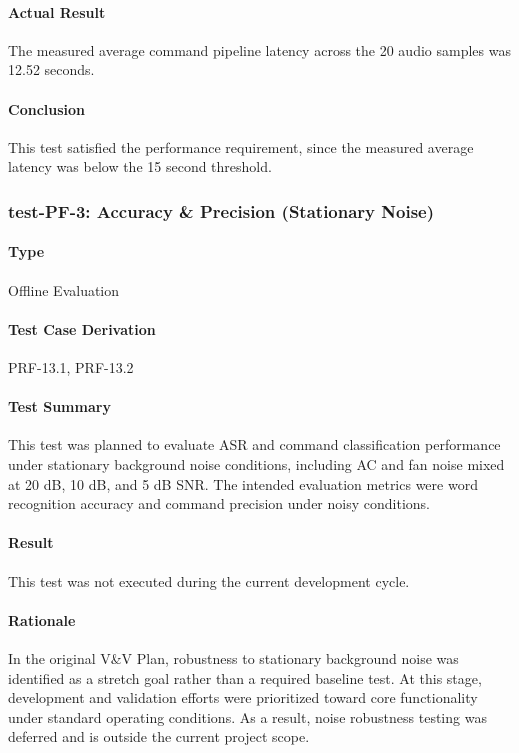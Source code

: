 \documentclass[12pt, titlepage]{article}
\begin{document}
\paragraph{Actual Result}
The measured average command pipeline latency across the 20 audio samples was 12.52 seconds.

\paragraph{Conclusion}
This test satisfied the performance requirement, since the measured average latency was below the 15 second threshold.

\subsubsection{test-PF-3: Accuracy \& Precision (Stationary Noise)}

\paragraph{Type}
Offline Evaluation

\paragraph{Test Case Derivation}
PRF-13.1, PRF-13.2

\paragraph{Test Summary}
This test was planned to evaluate ASR and command classification performance under stationary background noise conditions, including AC and fan noise mixed at 20 dB, 10 dB, and 5 dB SNR. The intended evaluation metrics were word recognition accuracy and command precision under noisy conditions.

\paragraph{Result}
This test was not executed during the current development cycle.

\paragraph{Rationale}
In the original V\&V Plan, robustness to stationary background noise was identified as a stretch goal rather than a required baseline test. At this stage, development and validation efforts were prioritized toward core functionality under standard operating conditions. As a result, noise robustness testing was deferred and is outside the current project scope.
\end{document}
